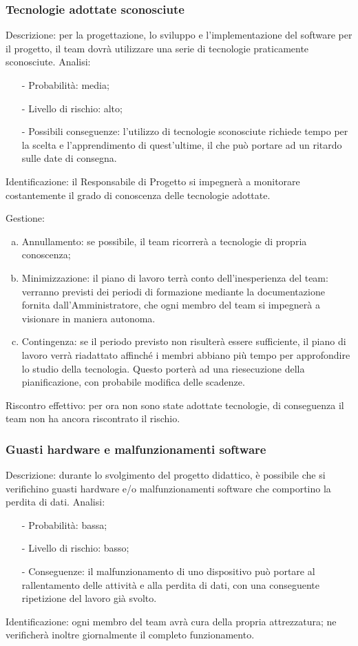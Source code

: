 \documentclass[../PianoProgetto.tex]{subfiles}
\begin{document}
\subsubsection{Tecnologie adottate sconosciute}
	Descrizione: per la progettazione, lo sviluppo e l’implementazione del software per il progetto, il team dovrà utilizzare una serie di tecnologie praticamente sconosciute.
	Analisi:
	\begin{itemize}
		\item[-] Probabilità: media;
		\item[-] Livello di rischio: alto;
		\item[-] Possibili conseguenze: l’utilizzo di tecnologie sconosciute richiede tempo per la scelta e l’apprendimento di quest’ultime, il che può portare ad un ritardo sulle date di consegna.
	\end{itemize}
	
	Identificazione: il Responsabile di Progetto si impegnerà a monitorare costantemente il grado di conoscenza delle tecnologie adottate.
	
	Gestione:
	\begin{enumerate}[(a)]
		\item Annullamento: se possibile, il team ricorrerà a tecnologie di propria conoscenza;
		\item Minimizzazione: il piano di lavoro terrà conto dell’inesperienza del team: verranno previsti dei periodi di formazione mediante la documentazione fornita dall’Amministratore, che ogni membro del team si impegnerà a visionare in maniera autonoma.
		\item Contingenza: se il periodo previsto non risulterà essere sufficiente, il piano di lavoro verrà riadattato affinché i membri abbiano più tempo per approfondire lo studio della tecnologia. Questo porterà ad una riesecuzione della pianificazione, con probabile modifica delle scadenze.
	\end{enumerate} 
	Riscontro effettivo: per ora non sono state adottate tecnologie, di conseguenza il team non ha ancora riscontrato il rischio.

	\subsubsection{Guasti hardware e malfunzionamenti software}
	Descrizione: durante lo svolgimento del progetto didattico, è possibile che si verifichino guasti hardware e/o malfunzionamenti software che comportino la perdita di dati.
	Analisi:
	\begin{itemize}
		\item[-] Probabilità: bassa;
		\item[-] Livello di rischio: basso;
		\item[-] Conseguenze: il malfunzionamento di uno dispositivo può portare al rallentamento delle attività e alla perdita di dati, con una conseguente ripetizione del lavoro già svolto.
	\end{itemize}
	Identificazione: ogni membro del team avrà cura della propria attrezzatura; ne verificherà inoltre giornalmente il completo funzionamento.
	
\end{document}
